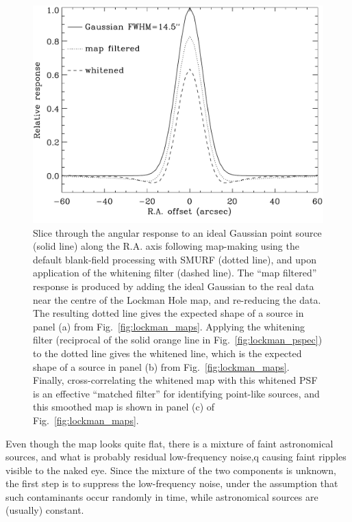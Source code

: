 \documentclass[useAMS,usenatbib,nofootinbib]{mn2e}
\begin{document}
\begin{figure}
\centering
\includegraphics[width=\linewidth]{lockman_psf.pdf}
\caption{Slice through the angular response to an ideal Gaussian point
  source (solid line) along the R.A. axis following map-making using
  the default blank-field processing with SMURF (dotted line), and
  upon application of the whitening filter (dashed line). The ``map
  filtered'' response is produced by adding the ideal Gaussian to the
  real data near the centre of the Lockman Hole map, and re-reducing
  the data. The resulting dotted line gives the expected shape of a
  source in panel (a) from Fig.~\ref{fig:lockman_maps}. Applying the
  whitening filter (reciprocal of the solid orange line in
  Fig.~\ref{fig:lockman_pspec}) to the dotted line gives the whitened
  line, which is the expected shape of a source in panel (b) from
  Fig.~\ref{fig:lockman_maps}. Finally, cross-correlating the whitened
  map with this whitened PSF is an effective ``matched filter'' for
  identifying point-like sources, and this smoothed map is shown in
  panel (c) of Fig.~\ref{fig:lockman_maps}.}
\label{fig:lockman_psf}
\end{figure}

Even though the map looks quite flat, there is a mixture of faint
astronomical sources, and what is probably residual low-frequency
noise,q causing faint ripples visible to the naked eye. Since the
mixture of the two components is unknown, the first step is to
suppress the low-frequency noise, under the assumption that such
contaminants occur randomly in time, while astronomical sources are
(usually) constant.
\end{document}
